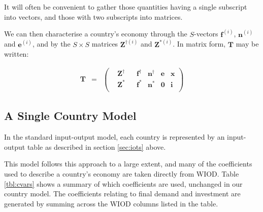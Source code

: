\documentclass[a4paper]{article}
\begin{document}
It will often be convenient to gather those quantities having a single subscript into vectors, and those with two subscripts into matrices. 

We can then characterise a country's economy through the $S$-vectors $\boldsymbol{f}^{(i)}$, $\boldsymbol{n}^{(i)}$ and $\boldsymbol{e}^{(i)}$, and by the $S\times S$ matrices $\boldsymbol{Z}^{\dagger(i)}$ and $\boldsymbol{Z}^{*(i)}$.
In matrix form, $\boldsymbol{T}$ may be written:

\begin{equation}\label{eqn:Tvectorised}
\begin{array}{rcc}
\boldsymbol{T} & = & 
\left(
	\begin{array}{ccccccc}
 & \boldsymbol{Z}^{\dag} & & \boldsymbol{f}^\dag & \boldsymbol{n}^\dag & \boldsymbol{e} & \boldsymbol{x} \\
 & \boldsymbol{Z}^* & & \boldsymbol{f}^* & \boldsymbol{n}^* & \boldsymbol{0} & \boldsymbol{i} \\
	\end{array} 
\right)
\end{array}
\end{equation}

\subsection{A Single Country Model}\label{sec:countries}
In the standard input-output model, each country is represented by an input-output table as described in section \ref{sec:iots} above.

This model follows this approach to a large extent, and many of the coefficients used to describe a country's economy are taken directly from WIOD.
Table \ref{tbl:cvars} shows a summary of which coefficients are used, unchanged in our country model.
The coefficients relating to final demand and investment are generated by summing across the WIOD columns listed in the table.
\end{document}
